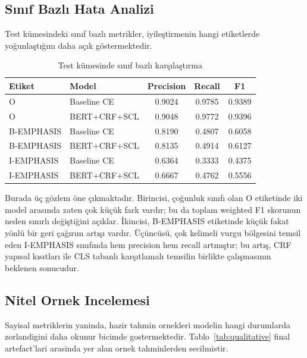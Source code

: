 \documentclass[conference]{IEEEtran}
\begin{document}
\subsection{Sınıf Bazlı Hata Analizi}
Test kümesindeki sınıf bazlı metrikler, iyileştirmenin hangi etiketlerde yoğunlaştığını daha açık göstermektedir.

\begin{table}[H]
\centering
\caption{Test kümesinde sınıf bazlı karşılaştırma}
\footnotesize
\begin{tabular}{llccc}
\toprule
Etiket & Model & Precision & Recall & F1 \\
\midrule
O & Baseline CE & 0.9024 & 0.9785 & 0.9389 \\
O & BERT+CRF+SCL & 0.9048 & 0.9772 & 0.9396 \\
B-EMPHASIS & Baseline CE & 0.8190 & 0.4807 & 0.6058 \\
B-EMPHASIS & BERT+CRF+SCL & 0.8135 & 0.4914 & 0.6127 \\
I-EMPHASIS & Baseline CE & 0.6364 & 0.3333 & 0.4375 \\
I-EMPHASIS & BERT+CRF+SCL & 0.6667 & 0.4762 & 0.5556 \\
\bottomrule
\end{tabular}
\end{table}

Burada üç gözlem öne çıkmaktadır. Birincisi, çoğunluk sınıfı olan O etiketinde iki model arasında zaten çok küçük fark vardır; bu da toplam weighted F1 skorunun neden sınırlı değiştiğini açıklar. İkincisi, B-EMPHASIS etiketinde küçük fakat yönlü bir geri çağırım artışı vardır. Üçüncüsü, çok kelimeli vurgu bölgesini temsil eden I-EMPHASIS sınıfında hem precision hem recall artmıştır; bu artış, CRF yapısal kısıtları ile CLS tabanlı karşıtlamalı temsilin birlikte çalışmasının beklenen sonucudur.

\subsection{Nitel Ornek Incelemesi}
Sayisal metriklerin yaninda, hazir tahmin ornekleri modelin hangi durumlarda zorlandigini daha okunur bicimde gostermektedir. Tablo~\ref{tab:qualitative} final artefact'lari arasinda yer alan ornek tahminlerden secilmistir.
\end{document}

